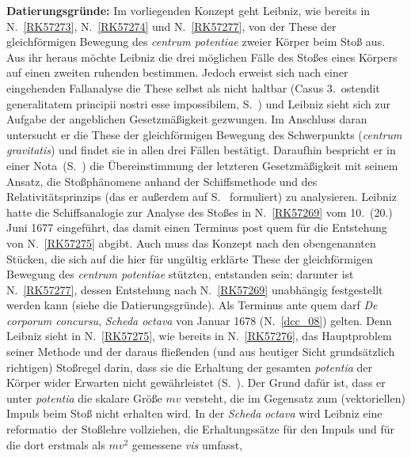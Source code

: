 \begin{ledgroup}
\footnotesize
\pstart
\noindent%
\textbf{Datierungsgründe:} %
Im vorliegenden Konzept geht Leibniz, wie bereits in N.~\ref{RK57273}, N.~\ref{RK57274} und N.~\ref{RK57277},
%
von der These der gleichförmigen Bewegung des \textit{centrum potentiae} zweier Körper beim Stoß aus.
%
Aus ihr heraus möchte Leibniz die drei möglichen Fälle des Stoßes eines Körpers auf einen zweiten ruhenden bestimmen.
%
Jedoch erweist sich nach einer eingehenden Fallanalyse die These selbst als nicht haltbar 
%
(\glqq Casus 3.\ ostendit generalitatem principii nostri esse impossibilem\grqq, S.~)
%
und Leibniz sieht sich zur Aufgabe der angeblichen Gesetzmäßigkeit gezwungen.
%
Im Anschluss daran untersucht er die These der gleichförmigen Bewegung des Schwerpunkts (\textit{centrum gravitatis}) 
%
und findet sie in allen drei Fällen bestätigt. 
%
Daraufhin bespricht er in einer \glqq Nota\grqq\ (S.~) 
die Übereinstimmung der letzteren Gesetzmäßigkeit  mit seinem Ansatz, 
%
die Stoßphänomene anhand der Schiffsmethode und des Relativitätsprinzips
(das er außerdem auf S.~ formuliert) zu analysieren.
%
Leibniz hatte die Schiffsanalogie zur Analyse des Stoßes in N.~\ref{RK57269} vom 10.\ (20.) Juni 1677 eingeführt, das damit einen Terminus post quem für die Entstehung von  N.~\ref{RK57275} abgibt.
%
Auch muss das Konzept nach den obengenannten Stücken, die sich auf die hier für ungültig erklärte These der gleichförmigen Bewegung des \textit{centrum potentiae} stützten, entstanden sein;
%
darunter ist N.~\ref{RK57277}, dessen Entstehung nach N.~\ref{RK57269} unabhängig festgestellt werden kann (siehe die Datierungsgründe).
\pend
%
\pstart
Als Terminus ante quem darf  \textit{De corporum concursu}, \textit{Scheda octava} von Januar 1678 (N.~\ref{dcc_08}) gelten.
%
Denn Leibniz sieht in N.~\ref{RK57275}, wie bereits in N.~\ref{RK57276}, das Hauptproblem seiner Methode und der
%
daraus fließenden (und aus heutiger Sicht grundsätzlich richtigen) Stoßregel darin, dass 
%
sie die Erhaltung der gesamten \textit{potentia} der Körper wider Erwarten nicht gewährleistet
(S.~).
%
Der Grund dafür ist, dass er unter \textit{potentia} die skalare Größe $mv$ versteht, die im Gegensatz zum (vektoriellen) Impuls  beim Stoß nicht erhalten wird.
%
In der \textit{Scheda octava} wird Leibniz eine \glqq reformatio\grqq\  der Stoßlehre vollziehen,
%
die Erhaltungssätze für den Impuls und für die dort erstmals als $mv^2$ gemessene \textit{vis} umfasst,

\end{ledgroup}
